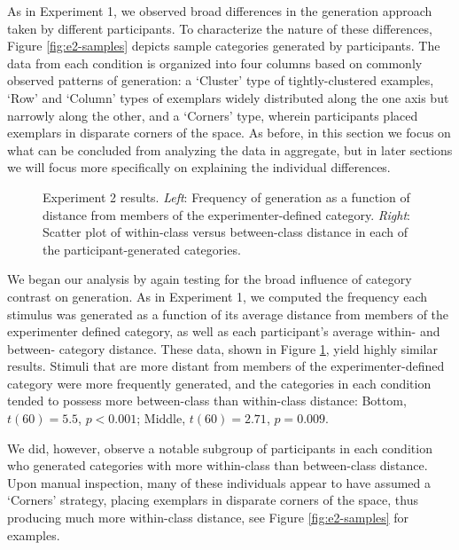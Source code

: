 \documentclass[12pt]{article}
\newcommand\inputpgf[2]{{
\let\pgfimageWithoutPath\pgfimage
\renewcommand{\pgfimage}[2][]{\pgfimageWithoutPath[##1]{#1/##2}}

}}
\begin{document}
\begin{flushleft}
As in Experiment 1, we observed broad differences in the generation approach taken by different participants.  To characterize the nature of these differences, Figure \ref{fig:e2-samples} depicts sample categories generated by participants. The data from each condition is organized into four columns based on commonly observed patterns of generation: a `Cluster' type of tightly-clustered examples,   `Row' and `Column' types of exemplars widely distributed along the one axis but narrowly along the other, and a `Corners' type, wherein participants placed exemplars in disparate corners of the space. As before, in this section we focus on what can be concluded from analyzing the data in aggregate, but in later sections we will focus more specifically on explaining the individual differences.

\begin{figure}
    \begin{center}
    \inputpgf{figs/}{e2-distanceplots.pgf}
    \caption{Experiment 2 results. \textit{Left}: Frequency of generation as a function of distance from members of the experimenter-defined category. \textit{Right}: Scatter plot of within-class versus between-class distance in each of the participant-generated categories.}
    \label{fig:e2-distanceplots}
    \end{center}
\end{figure}

We began our analysis by again testing for the broad influence of category contrast on generation. As in Experiment 1, we computed the frequency each stimulus was generated as a function of its average distance from members of the experimenter defined category, as well as each participant's average within- and between- category distance. These data, shown in Figure \ref{fig:e2-distanceplots}, yield highly similar results. Stimuli that are more distant from members of the experimenter-defined category were more frequently generated, and the categories in each condition tended to possess more between-class than within-class distance: Bottom, $t(60) = 5.5$, $p < 0.001$; Middle, $t(60) = 2.71$, $p = 0.009$. 

We did, however, observe a notable subgroup of participants in each condition who generated categories with more within-class than between-class distance. Upon manual inspection, many of these individuals appear to have assumed a `Corners' strategy, placing exemplars in disparate corners of the space, thus producing much more within-class distance, see Figure \ref{fig:e2-samples} for examples.


\end{flushleft}
\end{document}
